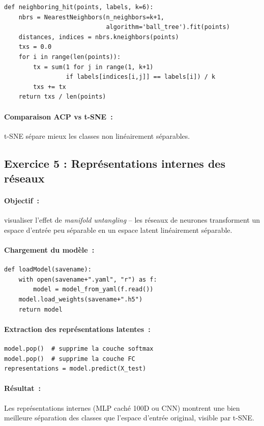 \documentclass[a4paper,11pt]{article}
\theoremstyle{definition}
\theoremstyle{remark}
\begin{document}
\begin{lstlisting}
def neighboring_hit(points, labels, k=6):
    nbrs = NearestNeighbors(n_neighbors=k+1,
                            algorithm='ball_tree').fit(points)
    distances, indices = nbrs.kneighbors(points)
    txs = 0.0
    for i in range(len(points)):
        tx = sum(1 for j in range(1, k+1)
                 if labels[indices[i,j]] == labels[i]) / k
        txs += tx
    return txs / len(points)
\end{lstlisting}

\paragraph{Comparaison ACP vs t-SNE~:} t-SNE s\'epare mieux
les classes non lin\'eairement s\'eparables.

\subsection{Exercice 5 : Repr\'esentations internes des r\'eseaux}

\paragraph{Objectif~:} visualiser l'effet de \emph{manifold
untangling} -- les r\'eseaux de neurones transforment un espace
d'entr\'ee peu s\'eparable en un espace latent lin\'eairement
s\'eparable.

\paragraph{Chargement du mod\`ele~:}
\begin{lstlisting}
def loadModel(savename):
    with open(savename+".yaml", "r") as f:
        model = model_from_yaml(f.read())
    model.load_weights(savename+".h5")
    return model
\end{lstlisting}

\paragraph{Extraction des repr\'esentations latentes~:}
\begin{lstlisting}
model.pop()  # supprime la couche softmax
model.pop()  # supprime la couche FC
representations = model.predict(X_test)
\end{lstlisting}

\paragraph{R\'esultat~:} Les repr\'esentations internes (MLP cach\'e
100D ou CNN) montrent une bien meilleure s\'eparation des classes
que l'espace d'entr\'ee original, visible par t-SNE.
\end{document}

